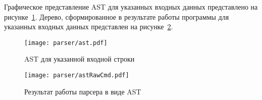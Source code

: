 Графическое представление AST для указанных входных данных представлено на рисунке~\ref{f:ast}.
Дерево, сформированное в результате работы программы для указанных входных данных представлен на рисунке~\ref{f:astRawCmd}.

\begin{figure}[ht]
	\centering
	\vspace{\toppaddingoffigure}
	\texttt{[image: parser/ast.pdf]}
	\caption{AST для указанной входной строки}
	\label{f:ast}
\end{figure}

\clearpage

\begin{figure}[!htb]
	\centering
	\texttt{[image: parser/astRawCmd.pdf]}
	\caption{Результат работы парсера в виде AST}
	\label{f:astRawCmd}
\end{figure}

\clearpage